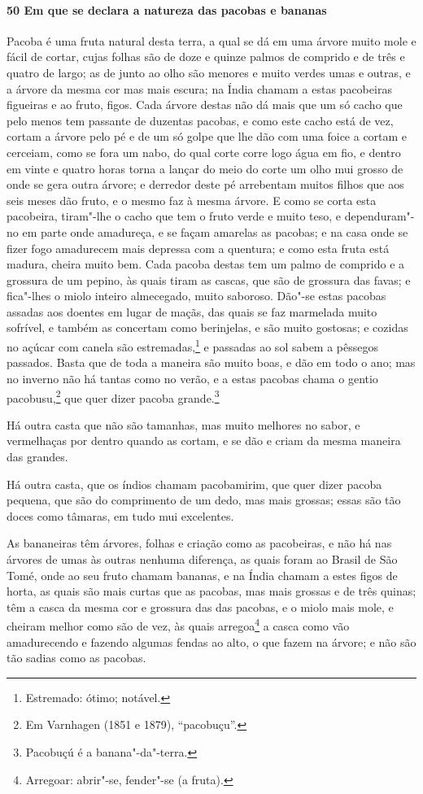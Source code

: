 \begin{linenumbers}
\paragraph{50 Em que se declara a natureza das pacobas e bananas}\quad
\mbox{Pacoba} é uma fruta natural desta terra, a qual se dá em uma árvore muito mole e fácil de
cortar, cujas folhas são de doze e quinze palmos de comprido e de três e quatro de largo;
as de junto ao olho são menores e muito verdes umas e outras, e a árvore da mesma cor mas
mais escura; na Índia chamam a estas pacobeiras figueiras e ao fruto, figos. Cada árvore
destas não dá mais que um só cacho que pelo menos tem passante de duzentas pacobas, e como
este cacho está de vez, cortam a árvore pelo pé e de um só golpe que lhe dão com uma foice
a cortam e cerceiam, como se fora um nabo, do qual corte corre logo água em fio, e dentro
em vinte e quatro horas torna a lançar do meio do corte um olho mui grosso de onde se gera
outra árvore; e derredor deste pé arrebentam muitos filhos que aos seis meses dão fruto, e
o mesmo faz à mesma árvore. E como se corta esta pacobeira, tiram"-lhe o cacho que tem o
fruto verde e muito teso, e dependuram"-no em parte onde amadureça, e se façam amarelas as
pacobas; e na casa onde se fizer fogo amadurecem mais depressa com a quentura; e como esta
fruta está madura, cheira muito bem. Cada pacoba destas tem um palmo de comprido e a
grossura de um pepino, às quais tiram as cascas, que são de grossura das favas; e
fica"-lhes o miolo inteiro almecegado, muito saboroso. Dão"-se estas pacobas assadas aos
doentes em lugar de maçãs, das quais se faz marmelada muito sofrível, e também as
concertam como berinjelas, e são muito gostosas; e cozidas no açúcar com canela são
estremadas,\footnote{ Estremado: ótimo; notável.} e passadas ao sol sabem a pêssegos
passados. Basta que de toda a maneira são muito boas, e dão em todo o ano; mas no inverno
não há tantas como no verão, e a estas pacobas chama o gentio pacobusu,\footnote{ Em
Varnhagen (1851 e 1879), ``pacobuçu''.} que quer dizer pacoba grande.\footnote{ Pacobuçú é
a banana"-da"-terra.}

Há outra casta que não são tamanhas, mas muito melhores no sabor, e vermelhaças por dentro
quando as cortam, e se dão e criam da mesma maneira das grandes.

Há outra casta, que os índios chamam pacobamirim, que quer dizer pacoba pequena, que são
do comprimento de um dedo, mas mais grossas; essas são tão doces como tâmaras, em tudo mui
excelentes.

As bananeiras têm árvores, folhas e criação como as pacobeiras, e não há nas árvores de
umas às outras nenhuma diferença, as quais foram ao Brasil de São Tomé, onde ao seu fruto
chamam bananas, e na Índia chamam a estes figos de horta, as quais são mais curtas que as
pacobas, mas mais grossas e de três quinas; têm a casca da mesma cor e grossura das das
pacobas, e o miolo mais mole, e cheiram melhor como são de vez, às quais arregoa\footnote{
Arregoar: abrir"-se, fender"-se (a fruta).} a casca como vão amadurecendo e fazendo algumas
fendas ao alto, o que fazem na árvore; e não são tão sadias como as pacobas.


\end{linenumbers}
